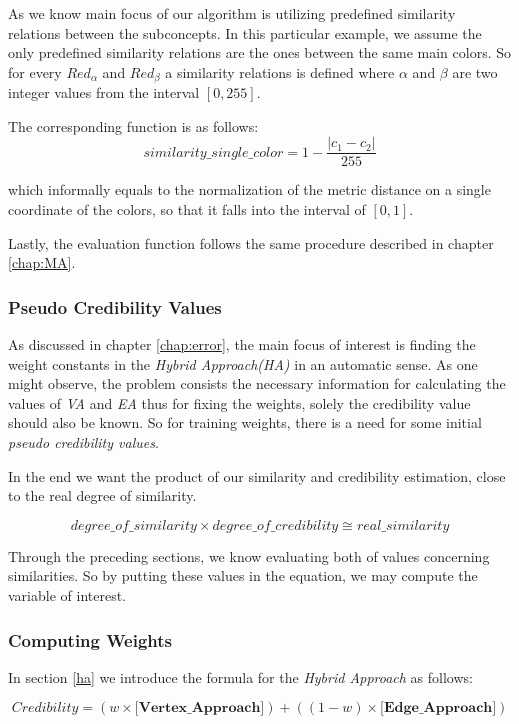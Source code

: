 \documentclass[egilmezThesis.tex]{subfiles}
\begin{document}
As we know main focus of our algorithm is utilizing predefined similarity relations between the subconcepts. In this particular example, we assume the only predefined similarity relations are the ones between the same  main colors. So for every $Red_\alpha$ and $Red_\beta$ a similarity relations is defined where $\alpha$ and $\beta$ are two integer values from the interval $[0, 255]$. 

The corresponding function is as follows:
$$similarity\_single\_color = 1 - \frac{|c_1-c_2|}{255}$$
  
which informally equals to the normalization of the metric distance on a single coordinate of the colors, so that it falls  into the interval of $[0,1]$.

Lastly, the evaluation function follows the same procedure described in chapter \ref{chap:MA}.



\subsubsection{Pseudo Credibility Values}
\label{pcv}

As discussed in chapter \ref{chap:error}, the main focus of interest is finding the weight constants in the \textit{Hybrid Approach(HA)} in an automatic sense. As one might observe, the problem consists the necessary information for calculating the values of \textit{VA} and \textit{EA} thus for fixing the weights, solely the credibility value should also be known. So for training weights, there is a need for some initial \textit{pseudo credibility values}.

In the end we want the product of our similarity and credibility estimation, close to the real degree of similarity.

$$  degree\_of\_similarity \times degree\_of\_credibility \cong real\_similarity $$

Through the preceding sections, we know evaluating both of values concerning similarities. So by putting these values in the equation, we may compute the variable of interest.


\subsubsection{Computing Weights}
\label{weights}

In section \ref{ha} we introduce the formula for the \textit{Hybrid Approach} as follows:

\begin{equation}
\textit{Credibility} = (w \times  \textbf{[Vertex\_Approach]}) + ((1-w) \times  \textbf{[Edge\_Approach]})
\end{equation}
\end{document}
